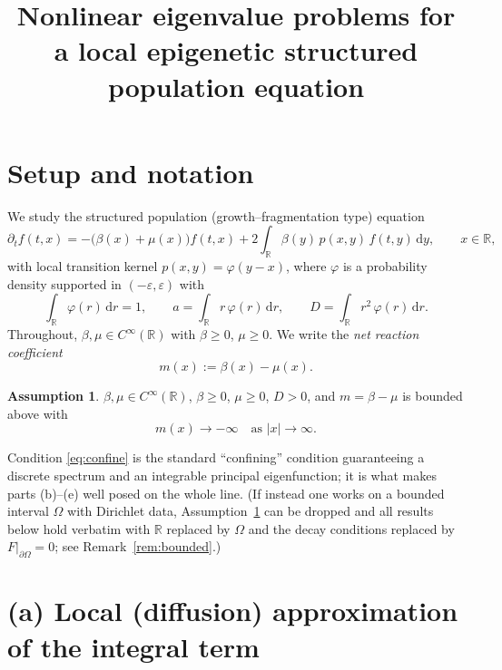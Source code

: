 \documentclass{amsart}
\theoremstyle{definition}
\newtheorem{assumption}{Assumption}
\newcommand{\R}{\mathbb{R}}
\newcommand{\dd}{\,\mathrm{d}}
\begin{document}
\title{Nonlinear eigenvalue problems for a local epigenetic structured population equation}
\maketitle

\section*{Setup and notation}

We study the structured population (growth--fragmentation type) equation
\begin{equation}\label{eq:master}
\partial_t f(t,x) = -\bigl(\beta(x)+\mu(x)\bigr) f(t,x) + 2\int_{\R} \beta(y)\,p(x,y)\, f(t,y)\dd y,
\qquad x\in\R,
\end{equation}
with local transition kernel $p(x,y)=\varphi(y-x)$, where $\varphi$ is a probability
density supported in $(-\varepsilon,\varepsilon)$ with
\begin{equation}\label{eq:moments}
\int_\R \varphi(r)\dd r=1,\qquad
a=\int_\R r\,\varphi(r)\dd r,\qquad
D=\int_\R r^2\,\varphi(r)\dd r .
\end{equation}
Throughout, $\beta,\mu\in C^\infty(\R)$ with $\beta\ge 0$, $\mu\ge 0$. We write the
\emph{net reaction coefficient}
\begin{equation}\label{eq:m}
m(x):=\beta(x)-\mu(x).
\end{equation}

\begin{assumption}\label{ass:confine}
$\beta,\mu\in C^\infty(\R)$, $\beta\ge0$, $\mu\ge0$, $D>0$, and $m=\beta-\mu$ is bounded above with
\begin{equation}\label{eq:confine}
m(x)\to-\infty\quad\text{as }|x|\to\infty .
\end{equation}
\end{assumption}

Condition \eqref{eq:confine} is the standard ``confining'' condition guaranteeing a
discrete spectrum and an integrable principal eigenfunction; it is what makes parts
(b)--(e) well posed on the whole line. (If instead one works on a bounded interval
$\Omega$ with Dirichlet data, Assumption~\ref{ass:confine} can be dropped and all
results below hold verbatim with $\R$ replaced by $\Omega$ and the decay conditions
replaced by $F|_{\partial\Omega}=0$; see Remark~\ref{rem:bounded}.)

\bigskip

\section{(a) Local (diffusion) approximation of the integral term}
\end{document}
